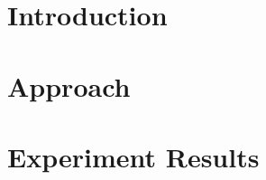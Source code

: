 \section{Introduction}
\label{chap4:sec:introduction}

\section{Approach}
\label{chap4:sec:approach}


\section{Experiment Results}
\label{chap4:experiment_results}

        
  

